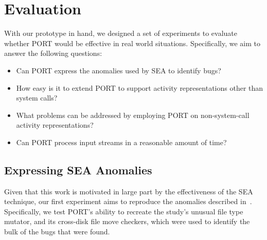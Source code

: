 \section{Evaluation}
\label{SEC:evaluation}

With our prototype in hand, we designed a set of experiments to evaluate
whether PORT would be effective in real world situations.
Specifically, we aim to answer the following questions:

\begin{itemize}

  \item{Can PORT express the anomalies used by SEA to identify bugs?}

  \item{How easy is it to extend PORT to support activity representations
    other than system calls?}

  \item{What problems can be addressed by employing PORT on
  non-system-call activity representations?}

  \item{Can PORT process input streams in a reasonable amount of time?}

\end{itemize}


\subsection{Expressing SEA Anomalies}
\label{sub:SEAAnomalies}
Given that this work is motivated
in large part
by the effectiveness of the SEA technique,
our first experiment aims to reproduce the anomalies described
in~\cite{DBLP:conf/issre/MooreCFW19}.
Specifically,
we test PORT's ability to recreate
the study's unusual file type mutator,
and its cross-disk file move checkers, which were used to identify
the bulk of the bugs that were found.



